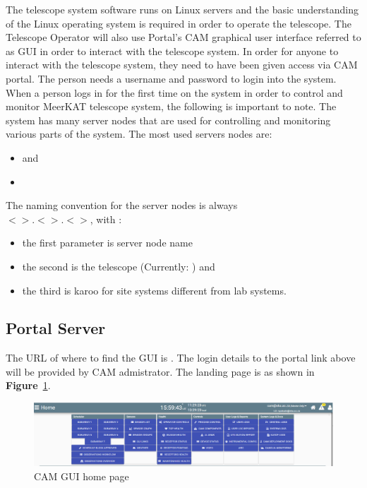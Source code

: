 
        The telescope system software runs on Linux servers and the basic understanding of the Linux operating system is required in order to operate the telescope. The Telescope Operator will also use Portal’s CAM graphical user interface referred to as GUI in order to interact with the telescope system. In order for anyone to interact with the telescope system, they need to have been given access via CAM portal.  The person needs a username and password to login into the system. When a person logs in for the first time on the system in order to control and monitor MeerKAT telescope system, the following is important to note. The system has many server nodes that are used for controlling and monitoring various parts of the system.  The most used servers nodes are:
        \begin{itemize}
\item{}  and
\item{}  
\end{itemize}
The naming convention for the server nodes is always\\ $<$$>$.$<$$>.<$$>$, with :
\begin{itemize}
\item{} the first parameter is server node name
\item{} the second is the telescope (Currently: ) and
\item{} the third is karoo for site systems different from lab systems.
\end{itemize}
\subsection{Portal Server}
The URL of where to find the GUI is . 
The login details to the portal link above will be provided by CAM admistrator.
The landing page is as shown in \textbf{Figure}~\ref{fig:image71}. 
\clearpage
\begin{figure}[!thb]
	\centering
	\includegraphics[scale=0.3]{Chapters/images/image71.png}
	
	\caption{CAM GUI home page}
	\label{fig:image71}
\end{figure}




